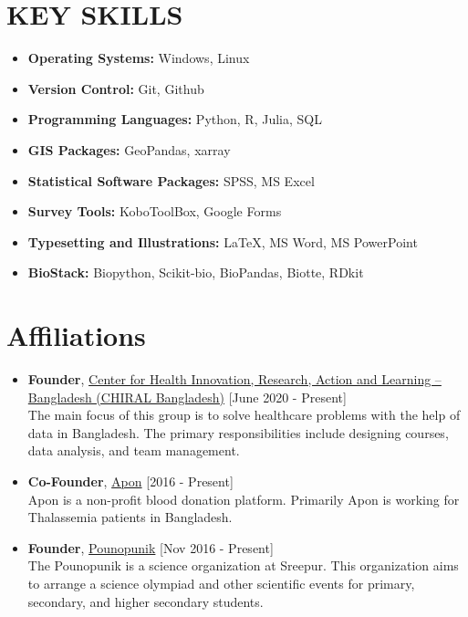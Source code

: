 \documentclass[11pt,a4paper]{moderncv}
\begin{document}
\section{KEY SKILLS}
\begin{multicols}{2}
	\begin{itemize}
		\item \textbf{Operating Systems:} Windows, Linux
		\item \textbf{Version Control:} Git, Github
	    \item \textbf{Programming Languages:} Python, R, Julia, SQL
	    \item \textbf{GIS Packages:} GeoPandas, xarray
		\item \textbf{Statistical Software Packages:} SPSS, MS Excel
		
	\end{itemize}
	\columnbreak 
	\begin{itemize}
		\item \textbf{Survey Tools:} KoboToolBox, Google Forms
		\item \textbf{Typesetting and Illustrations:} \LaTeX, MS Word, MS PowerPoint
		\item \textbf{BioStack:} Biopython, Scikit-bio, BioPandas, Biotte, RDkit
	\end{itemize}
\end{multicols} 


\section{Affiliations}
\begin{itemize}
	\item \textbf{Founder}, 
	\textcolor{blue}{\href{https://hdrobd.org/}{Center for Health Innovation, Research, Action and Learning -- Bangladesh (CHIRAL Bangladesh)}}
	\hfill [June 2020 - Present]\\ 
	The main focus of this group is to solve healthcare problems with the help 
	of data in Bangladesh. The primary responsibilities include designing 
	courses, data analysis, and team management.
	\item \textbf{Co-Founder}, 
	\textcolor{blue}{\href{}{Apon}}
	\hfill [2016 - Present]\\
	Apon is a non-profit blood donation platform. Primarily Apon is working for 
	Thalassemia patients in Bangladesh.
	\item \textbf{Founder}, 
	\textcolor{blue}{\href{}{Pounopunik}}
	\hfill [Nov 2016 - Present]\\
	The Pounopunik is a science organization at Sreepur. This organization aims 
	to arrange a science olympiad and other scientific events for primary, 
	secondary, and higher secondary students. 

\end{itemize}
\end{document}
